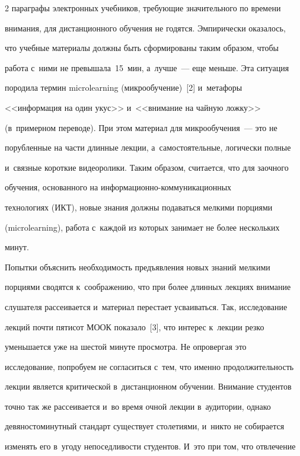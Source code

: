 \begin{multicols}{2}
параграфы электронных учебников, тре\-бу\-ющие значительного по времени 


внимания, для дистанционного обучения не годятся. Эмпирически оказалось, 


что учебные материалы должны быть сформированы таким образом, чтобы 


работа с~ними не превышала~15~мин, а~лучше~--- еще меньше. Эта ситуация 


породила термин microlearning (мик\-ро\-обуче\-ние)~[2] и~метафоры 


<<информация на один укус>> и~<<внимание на чайную ложку>> 


(в~примерном переводе). При этом материал для микрообучения~--- это не 


порубленные на части длинные лекции, а~самостоятельные, логически полные 


и~связные короткие видеоролики. Таким образом, считается, что для заочного 


обучения, основанного на ин\-фор\-ма\-ци\-он\-но-ком\-му\-ни\-ка\-ци\-он\-ных 


технологиях (ИКТ), новые знания должны подаваться мелкими порциями 


(microlearning), работа с~каждой из которых занимает не более нескольких 


минут. 


  


  Попытки объяснить необходимость предъявления новых знаний мелкими 


порциями сводятся к~соображению, что при более длинных лекциях внимание 


слушателя рассеивается и~материал перестает усваиваться. Так, исследование 


лекций почти пятисот МООК показало~[3], что интерес к~лекции резко 


уменьшается уже на шестой минуте про\-смот\-ра. Не опровергая это 


исследование, попробуем не согласиться с~тем, что именно продолжительность 


лекции является критической в~дистанционном обучении. Внимание студентов 


точно так же рассеивается и~во время очной лекции в~аудитории, однако 


девяностоминутный стандарт существует столетиями, и~ни\-кто не собирается 


изменять его в~угоду непоседливости студентов. И~это при том, что отвлечение 



\end{multicols}
